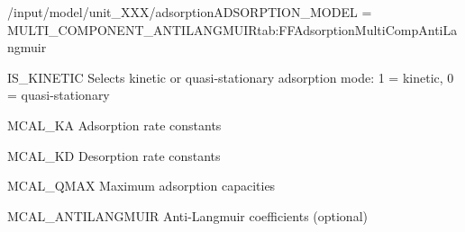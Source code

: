 \begin{condsubgroup}{/input/model/unit\_XXX/adsorption}{ADSORPTION\_MODEL = MULTI\_COMPONENT\_ANTILANGMUIR}{tab:FFAdsorptionMultiCompAntiLangmuir}
  \begin{dataset}[type=int,range={$\{ 0,1 \}$},length=1]{IS\_KINETIC}
    Selects kinetic or quasi-stationary adsorption mode: 1 = kinetic, 0 = quasi-stationary
  \end{dataset}
  \begin{dataset}[unit=\si{\cubic\metre\of{MP}\per\mol\per\second}, type=double,range={$\geq 0$},length={\texttt{NCOMP}}]{MCAL\_KA}
    Adsorption rate constants
  \end{dataset}
  \begin{dataset}[unit=\si{\per\second}, type=double,range={$\geq 0$},length={\texttt{NCOMP}}]{MCAL\_KD}
    Desorption rate constants
  \end{dataset}
  \begin{dataset}[unit=\si{\mol\per\cubic\metre\of{SP}}, type=double,range={$> 0$},length={\texttt{NCOMP}}]{MCAL\_QMAX}
    Maximum adsorption capacities
  \end{dataset}
  \begin{dataset}[unit=\si{\mol\per\cubic\metre\of{SP}}, type=double,range={$\{ -1, 1\}$},length={\texttt{NCOMP}}]{MCAL\_ANTILANGMUIR}
    Anti-Langmuir coefficients (optional)
  \end{dataset}
\end{condsubgroup}

